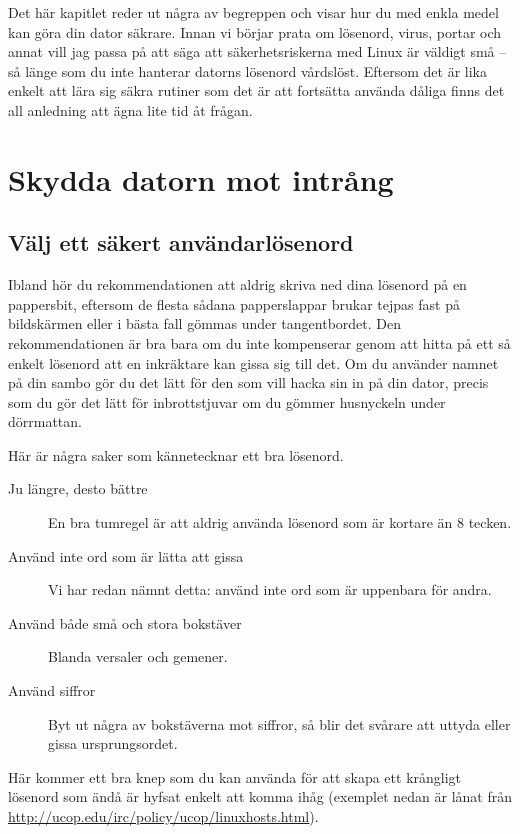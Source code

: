 \documentclass[a4paper,final]{memoir} %
\begin{document}
Det här kapitlet reder ut några av begreppen och visar hur du med enkla medel kan göra din dator säkrare. Innan vi börjar prata om lösenord, virus, portar och annat vill jag passa på att säga att säkerhetsriskerna med Linux är väldigt små -- så länge som du inte hanterar datorns lösenord vårdslöst. Eftersom det är lika enkelt att lära sig säkra rutiner som det är att fortsätta använda dåliga finns det all anledning att ägna lite tid åt frågan.

\section{Skydda datorn mot intrång}


\subsection{Välj ett säkert användarlösenord}\label{sec:securepasswords}

Ibland hör du rekommendationen att aldrig skriva ned dina lösenord på en pappersbit, eftersom de flesta sådana papperslappar brukar tejpas fast på bildskärmen eller i bästa fall gömmas under tangentbordet. Den rekommendationen är bra bara om du inte kompenserar genom att hitta på ett så enkelt lösenord att en inkräktare kan gissa sig till det. Om du använder namnet på din sambo gör du det lätt för den som vill hacka sin in på din dator, precis som du gör det lätt för inbrottstjuvar om du gömmer husnyckeln under dörrmattan.

Här är några saker som kännetecknar ett bra lösenord.

\begin{description}

\item[Ju längre, desto bättre] En bra tumregel är att aldrig använda lösenord som är kortare än 8 tecken. 
\item[Använd inte ord som är lätta att gissa] Vi har redan nämnt detta: använd inte ord som är uppenbara för andra. 
\item[Använd både små och stora bokstäver] Blanda versaler och gemener.
\item[Använd siffror] Byt ut några av bokstäverna mot siffror, så blir det svårare att uttyda eller gissa ursprungsordet.

\end{description}

Här kommer ett bra knep som du kan använda för att skapa ett krångligt lösenord som ändå är hyfsat enkelt att komma ihåg (exemplet nedan är lånat från \url{http://ucop.edu/irc/policy/ucop/linuxhosts.html}).
\end{document}
